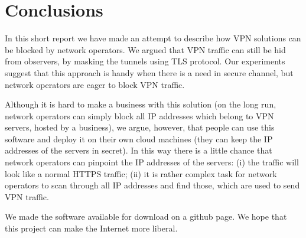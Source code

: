 \section{Conclusions}
\label{section:conclusion}

In this short report we have made an attempt to describe how VPN solutions
can be blocked by network operators. We argued that VPN traffic can still be
hid from observers, by masking the tunnels using TLS protocol. 
Our experiments suggest that this approach is handy when there is a need
in secure channel, but network operators are eager to block VPN traffic.

Although it is hard to make a business with this solution (on the long
run, network operators can simply block all IP addresses which belong to VPN servers,
hosted by a business), we argue, however, that people can use this software
and deploy it on their own cloud machines (they can keep the IP addresses 
of the servers in secret). In this way there is a little chance
that network operators can pinpoint the IP addresses of the servers: (i)
the traffic will look like a normal HTTPS traffic; (ii) it is rather complex task
for network operators to scan through all IP addresses and find those, which 
are used to send VPN traffic.

We made the software available for download on a github page. We hope that 
this project can make the Internet more liberal.